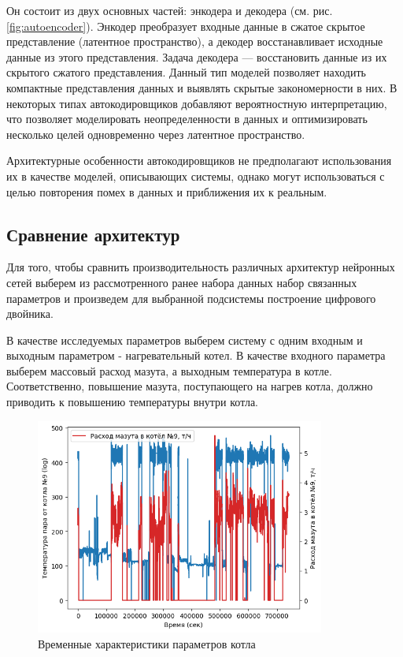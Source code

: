 Он состоит из двух основных частей: энкодера и декодера (см. рис.
\ref{fig:autoencoder}). Энкодер преобразует входные данные в сжатое 
скрытое представление (латентное пространство), а декодер восстанавливает 
исходные данные из этого представления. Задача декодера — восстановить данные 
из их скрытого сжатого представления. Данный тип моделей позволяет находить 
компактные представления данных и выявлять скрытые закономерности в них.
В некоторых типах автокодировщиков добавляют вероятностную интерпретацию, что
позволяет моделировать неопределенности в данных и оптимизировать несколько
целей одновременно через латентное пространство.

Архитектурные особенности автокодировщиков не предполагают использования их в
качестве моделей, описывающих системы, однако могут использоваться с целью
повторения помех в данных и приближения их к реальным.

\subsection{Сравнение архитектур}

Для того, чтобы сравнить производительность различных архитектур нейронных
сетей выберем из рассмотренного ранее набора данных набор связанных параметров
и произведем для выбранной подсистемы построение цифрового двойника. 

В качестве исследуемых параметров выберем систему с одним входным и выходным
параметром - нагревательный котел. В качестве входного параметра выберем
массовый расход мазута, а выходным температура в котле. Соответственно,
повышение мазута, поступающего на нагрев котла, должно приводить к повышению
температуры внутри котла. 

\begin{figure}[H]
  \centering
    \includegraphics[width=0.85\textwidth]{figures/plots/kotel_temp_mazut.png}
  \caption{Временные характеристики параметров котла}\label{fig:plt:kotel}
\end{figure}


